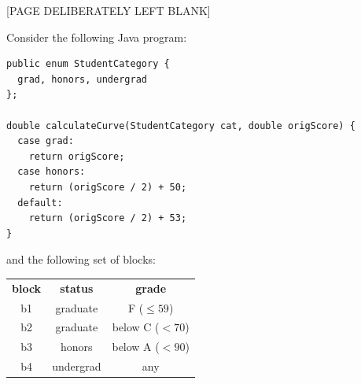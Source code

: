 \documentclass[addpoints]{exam}
\begin{document}
\begin{questions}

\newpage
\begin{center}
  [PAGE DELIBERATELY LEFT BLANK]
\end{center}
\newpage

\question Consider the following Java program:
  \begin{verbatim}
public enum StudentCategory {
  grad, honors, undergrad
};

double calculateCurve(StudentCategory cat, double origScore) {
  case grad:
    return origScore;
  case honors:
    return (origScore / 2) + 50;
  default:
    return (origScore / 2) + 53;
}
\end{verbatim}
and the following set of blocks:
\begin{tabular}{c|c|c}
  \textbf{block} & \textbf{status} & \textbf{grade} \\
  b1 & graduate & F ($\le 59$) \\
  b2 & graduate & below C ($< 70$) \\
  b3 & honors & below A ($< 90$) \\
  b4 & undergrad & any \\
\end{tabular}

\end{questions}
\end{document}
